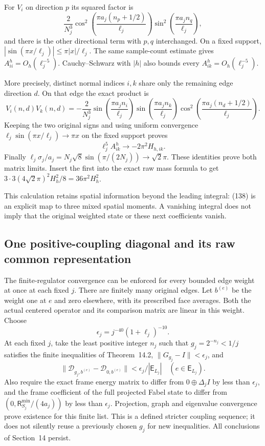 \documentclass[11pt]{article}
\begin{document}
For $V_i$ on direction $p$ its squared factor is
\[
 \frac2{N_j^3}
 \cos^2\left(\frac{\pi a_j(n_p+1/2)}{\ell_j}\right)
 \sin^2\left(\frac{\pi a_jn_q}{\ell_j}\right),
\]
and there is the other directional term with $p,q$ interchanged.
On a fixed support, $|\sin(\pi x/\ell_j)|\le\pi|x|/\ell_j$.
The same sample-count estimate gives $A^h_{ii}=O_h(\ell_j^{-5})$.
Cauchy--Schwarz with $|h|$ also bounds every
$A^h_{ik}=O_h(\ell_j^{-5})$.

More precisely, distinct normal indices $i,k$ share only the remaining
edge direction $d$. On that edge the exact product is
\[
 V_i(n,d)V_k(n,d)=
 -\frac2{N_j^3}
 \sin\left(\frac{\pi a_jn_i}{\ell_j}\right)
 \sin\left(\frac{\pi a_jn_k}{\ell_j}\right)
 \cos^2\left(\frac{\pi a_j(n_d+1/2)}{\ell_j}\right).
\]
Keeping the two original signs and using uniform convergence
$\ell_j\sin(\pi x/\ell_j)\to\pi x$ on the fixed support proves
\[
 \ell_j^5 A^h_{ik}\longrightarrow-2\pi^2H_{h,ik}.
\]
Finally $\ell_j\sigma_j/a_j=N_j\sqrt8\sin(\pi/(2N_j))
\to\sqrt2\pi$. These identities prove both matrix limits.
Insert the first into the exact raw mass formula to get
$3\cdot3(4\sqrt2\pi)^2H_h^2/8=36\pi^2H_h^2$.



This calculation retains spatial information beyond the leading
integral: (138) is an explicit map to three
mixed spatial moments. A vanishing integral does not imply that
the original weighted state or these next coefficients vanish.

\subsection{One positive-coupling diagonal and its raw common representation}

The finite-regulator convergence can be enforced for every bounded
edge weight at once at each fixed $j$. There are finitely many
original edges. Let $b^{(e)}$ be the weight one at $e$ and zero
elsewhere, with its prescribed face averages. Both the actual
centered operator and its comparison matrix are linear in this
weight. Choose
\[
 \epsilon_j=j^{-40}(1+\ell_j)^{-10}.
\]
At each fixed $j$, take the least positive integer $n_j$ such that
$g_j=2^{-n_j}<1/j$ satisfies the finite inequalities of
Theorem~14.2, $\|G_{g_j}-I\|<\epsilon_j$,
and
\[
 \|\mathcal D_{g_j,b^{(e)}}-\mathcal D_{0,b^{(e)}}\|
       <\epsilon_j/|\mathsf E_{L_j}|\quad(e\in\mathsf E_{L_j}).
\]
Also require the exact frame energy matrix to differ from
$0\oplus\Delta_jI$ by less than $\epsilon_j$, and the frame
coefficient of the full projected Fabel state to differ from
$(0,\mathsf R_{S_j}^{\min}/(4a_j))$ by less than $\epsilon_j$.
Projection, graph and eigenvalue convergence prove existence for
this finite list. This is a defined stricter coupling sequence;
it does not silently reuse a previously chosen $g_j$ for new
inequalities. All conclusions of Section~14 persist.
\end{document}
